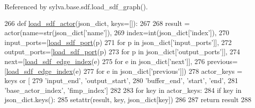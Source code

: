 Referenced by sylva.\+base.\+sdf.\+load\+\_\+sdf\+\_\+graph().


\begin{DoxyCode}
266     \textcolor{keyword}{def }\hyperlink{namespacesylva_1_1base_1_1sdf_a14b2bfbb0fd81d1e114b670f13f718f1}{load\_sdf\_actor}(json\_dict, keys=[]):
267 
268         result = actor(name=str(json\_dict[\textcolor{stringliteral}{'name'}]),
269                        index=int(json\_dict[\textcolor{stringliteral}{'index'}]),
270                        input\_ports=[\hyperlink{namespacesylva_1_1base_1_1sdf_a72bbd0e1cd0a666269ac3f17427954b8}{load\_sdf\_port}(p)
271                                     \textcolor{keywordflow}{for} p \textcolor{keywordflow}{in} json\_dict[\textcolor{stringliteral}{'input\_ports'}]],
272                        output\_ports=[\hyperlink{namespacesylva_1_1base_1_1sdf_a72bbd0e1cd0a666269ac3f17427954b8}{load\_sdf\_port}(p)
273                                      \textcolor{keywordflow}{for} p \textcolor{keywordflow}{in} json\_dict[\textcolor{stringliteral}{'output\_ports'}]],
274                        next=[\hyperlink{namespacesylva_1_1base_1_1sdf_a67886f481ab9be68797400241d754f64}{load\_sdf\_edge\_index}(e)
275                              \textcolor{keywordflow}{for} e \textcolor{keywordflow}{in} json\_dict[\textcolor{stringliteral}{'next'}]],
276                        previous=[\hyperlink{namespacesylva_1_1base_1_1sdf_a67886f481ab9be68797400241d754f64}{load\_sdf\_edge\_index}(e)
277                                  \textcolor{keywordflow}{for} e \textcolor{keywordflow}{in} json\_dict[\textcolor{stringliteral}{'previous'}]])
278         actor\_keys = keys \textcolor{keywordflow}{or} [
279             \textcolor{stringliteral}{'input\_end'}, \textcolor{stringliteral}{'output\_start'},
280             \textcolor{stringliteral}{'buffer\_end'}, \textcolor{stringliteral}{'start'}, \textcolor{stringliteral}{'end'},
281             \textcolor{stringliteral}{'base\_actor\_index'}, \textcolor{stringliteral}{'fimp\_index'}]
282 
283         \textcolor{keywordflow}{for} key \textcolor{keywordflow}{in} actor\_keys:
284             \textcolor{keywordflow}{if} key \textcolor{keywordflow}{in} json\_dict.keys():
285                 setattr(result, key, json\_dict[key])
286 
287         \textcolor{keywordflow}{return} result
288 
\end{DoxyCode}
\mbox{\label{namespacesylva_1_1base_1_1sdf_acd1ba464e47476a5205de3e3856fbb83}} 
